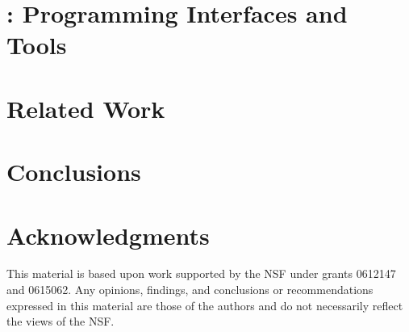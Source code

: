 \documentclass[nocopyrightspace]{sigplanconf}
\begin{document}
\section{\padsd{}:  Programming Interfaces and Tools}
\label{sec:programming}

\section{Related Work}
\label{sec:related}


\section{Conclusions}
\label{sec:conclusions}

\section*{Acknowledgments}

This material is based upon work 
supported by the NSF
   under grants 0612147 and 0615062.
Any opinions, findings, and conclusions or recommendations
   expressed in this material are those of the authors and do not
   necessarily reflect the views of the NSF.



\end{document}
